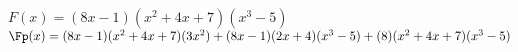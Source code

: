 {$F(x)=(8x-1)(x^2+4x+7)(x^3-5)$}
{$\Fp(x)=(8x-1)(x^2+4x+7)(3x^2)+(8x-1)(2x+4)(x^3-5)+(8)(x^2+4x+7)(x^3-5)$}

